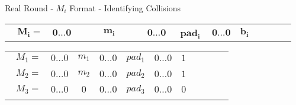 \begin{frame}{Real Round - $M_i$ Format - Identifying Collisions}

{\begin{table}[]
\centering
\begin{tabular}{c|c|c|c|c|c|c|llll}
\cline{2-7}
$\, \ \ \ \mathbf{M_i = }$ & $\mathbf{0 \dotsc 0}$ & $\, \ \qquad \mathbf{m_i} \, \ \qquad$ & $\mathbf{0 \dotsc 0}$ & \ $\mathbf{pad_i} \ $ & $\mathbf{0 \dotsc 0}$ & $\mathbf{b_i}$ &  &  &  &  \\ \cline{2-7}
\end{tabular}
\end{table}}

{\centering
\begin{tabular}{ccccccrllll}
\cline{2-7}
\multicolumn{1}{c|}{$\ \ \ M_1 = $}      & \multicolumn{1}{c|}{$0 \dotsc 0$} & \multicolumn{1}{c|}{$m_1$}             & \multicolumn{1}{c|}{$0 \dotsc 0$} & \multicolumn{1}{c|}{$pad_1$}    & \multicolumn{1}{c|}{$0 \dotsc 0$} & \multicolumn{1}{r|}{$1$}  &  &  &  &  \\ \cline{2-7}
                                   &                                   &                                        &                                   &                                 &                                   &                           &  &  &  &  \\ \cline{2-7}
\multicolumn{1}{c|}{$\ \ \ M_2 = $}     & \multicolumn{1}{c|}{$0 \dotsc 0$} & \multicolumn{1}{c|}{$m_2$}             & \multicolumn{1}{c|}{$0 \dotsc 0$} & \multicolumn{1}{c|}{$pad_2$}    & \multicolumn{1}{c|}{$0 \dotsc 0$} & \multicolumn{1}{r|}{$1$}  &  &  &  &  \\ \cline{2-7}
                                   &                                   &                                        &                                   &                                 &                                   &                           &  &  &  &  \\ \cline{2-7}
\multicolumn{1}{c|}{$\ \ \ M_3 = $}      & \multicolumn{1}{c|}{$0 \dotsc 0$} & \multicolumn{1}{c|}{$0$}               & \multicolumn{1}{c|}{$0 \dotsc 0$} & \multicolumn{1}{c|}{$pad_3$}    & \multicolumn{1}{c|}{$0 \dotsc 0$} & \multicolumn{1}{r|}{$0$}  &  &  &  &  \\ \cline{2-7}
                                   &                                   &                                        &                                   &                                 &                                   &                           &  &  &  &  \\ \cline{2-7}

\end{tabular}}
\end{frame}
